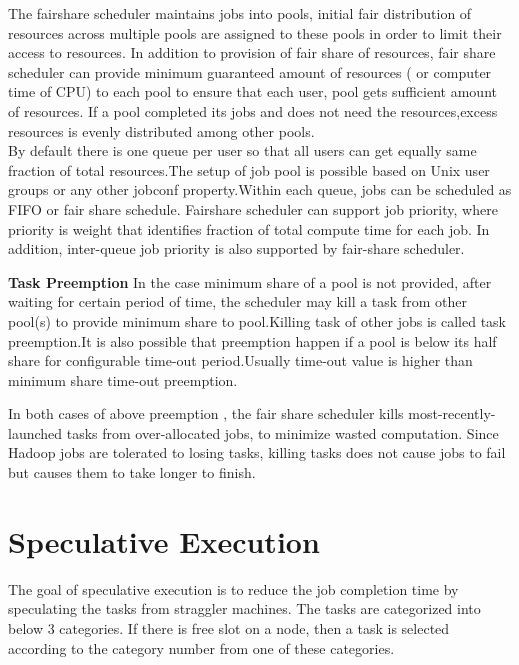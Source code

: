  
The fairshare scheduler maintains jobs into pools, initial fair distribution of resources across multiple pools are assigned to these pools in order to limit their access to resources. In addition to provision of fair share of resources, fair share scheduler can provide minimum guaranteed amount of resources ( or computer time of CPU) to each pool to ensure that each user, pool gets sufficient amount of resources. If a pool completed its jobs and does not need the resources,excess resources is evenly distributed among other pools.\cite{fair}\\

 By default there is one queue per user so that all users can get equally same fraction of total resources.The setup of job pool is possible based on Unix user groups or any other jobconf property.Within each queue, jobs can be scheduled as FIFO or fair share schedule. Fairshare scheduler can support job priority, where priority is weight that identifies fraction of total compute time for each job. In addition,  inter-queue job priority is also supported by fair-share scheduler.\cite{fair}
 
 
 \textbf{Task Preemption } In the case minimum share of a pool is not provided, after waiting for certain period of time, the scheduler may kill a task from other pool(s) to provide minimum share to pool.Killing task of other jobs is called task preemption.It is also possible that preemption happen if a pool is below its half share for configurable time-out period.Usually time-out value is higher than minimum share time-out preemption.\cite{fair} 
 
In both cases of above preemption , the fair share scheduler kills most-recently-launched tasks from over-allocated jobs, to minimize wasted computation. Since Hadoop jobs are tolerated to losing tasks, killing tasks does not cause jobs to fail but causes them to take longer to finish.\cite{fair}
 














\section{Speculative Execution}

The goal of speculative execution is to reduce the job completion time by speculating the tasks from straggler machines. The tasks are categorized into below 3 categories. If there is free slot on a node, then a task is selected according to the category number from one of these categories.  

